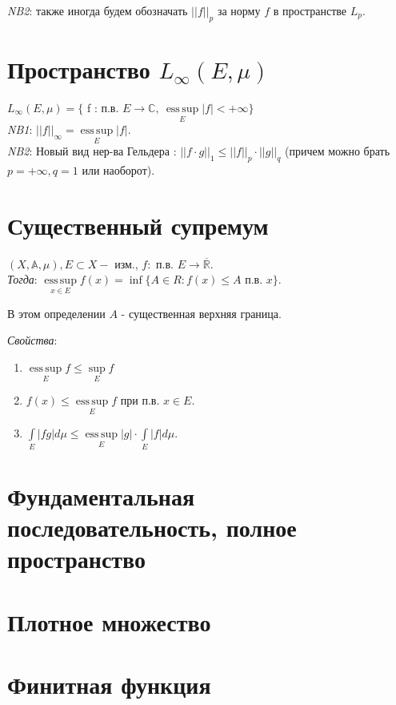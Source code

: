 \documentclass[paper=a4, fontsize=17pt]{article}
\DeclareMathOperator*{\esssup}{ess\, sup}
\begin{document}
\emph{NB2}: также иногда будем обозначать $||f||_p$ за норму $f$ в пространстве $L_p$.

\section{Пространство $L_{\infty}(E,\mu)$}
$L_\infty(E, \mu) =\{$ f : п.в. $E \rightarrow \mathbb{C},\ \esssup\limits_E |f| < +\infty \}$\\
\emph{NB1}: $||f||_\infty = \esssup\limits_E |f|$.\\

\emph{NB2}: Новый вид нер-ва Гельдера : $||f \cdot g||_1 \leq ||f||_p \cdot ||g||_q$ (причем можно брать $p = +\infty, q = 1$ или наоборот).

\section{Существенный супремум}
$(X, \mathds{A}, \mu), E \subset X - $ изм., $f : $ п.в. $E \rightarrow \overline{\mathbb{R}}$.\\

\emph{Тогда}: $\esssup\limits_{x \in E} f(x) = \inf \{A \in R : f(x) \leq A$ п.в. $x \}$. 

В этом определении $A$ - существенная верхняя граница. 

\emph{Свойства}:
\begin{enumerate}
	\item
	$\esssup\limits_E f \leq \sup\limits_E f$
	
	\item
	$f(x) \leq \esssup\limits_E f$ при п.в. $x \in E$.
	
	\item
	$\int\limits_E |fg|d\mu \leq \esssup\limits_E |g| \cdot \int\limits_E |f|d\mu$.
\end{enumerate}

\section{Фундаментальная последовательность, полное пространство}

\section{Плотное множество}

\section{Финитная функция}
\end{document}
